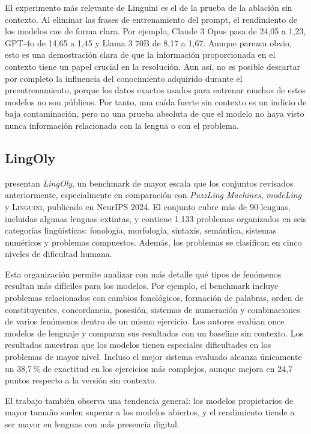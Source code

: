 El experimento más relevante de Linguini es el de la prueba de la ablación sin contexto. Al eliminar las frases de entrenamiento del prompt, el rendimiento de los modelos cae de forma clara. Por ejemplo, Claude 3 Opus pasa de 24,05 a 1,23, GPT-4o de 14,65 a 1,45 y Llama 3 70B de 8,17 a 1,67. Aunque parezca obvio, esto es una demostración clara de que la información proporcionada en el contexto tiene un papel crucial en la resolución. Aun así, no es posible descartar por completo la influencia del conocimiento adquirido durante el preentrenamiento, porque los datos exactos usados para entrenar muchos de estos modelos no son públicos. Por tanto, una caída fuerte sin contexto es un indicio de baja contaminación, pero no una prueba absoluta de que el modelo no haya visto nunca información relacionada con la lengua o con el problema.

\subsection{LingOly}

\citet{bean2024lingoly} presentan \textit{LingOly}, un benchmark de mayor escala que los conjuntos revisados anteriormente, especialmente en comparación con \textit{PuzzLing Machines}, \textit{modeLing} y \textsc{Linguini}, publicado en NeurIPS 2024. El conjunto cubre más de 90 lenguas, incluidas algunas lenguas extintas, y contiene 1.133 problemas organizados en seis categorías lingüísticas: fonología, morfología, sintaxis, semántica, sistemas numéricos y problemas compuestos. Además, los problemas se clasifican en cinco niveles de dificultad humana.

Esta organización permite analizar con más detalle qué tipos de fenómenos resultan más difíciles para los modelos. Por ejemplo, el benchmark incluye problemas relacionados con cambios fonológicos, formación de palabras, orden de constituyentes, concordancia, posesión, sistemas de numeración y combinaciones de varios fenómenos dentro de un mismo ejercicio. Los autores evalúan once modelos de lenguaje y comparan sus resultados con un baseline sin contexto. Los resultados muestran que los modelos tienen especiales dificultades en los problemas de mayor nivel. Incluso el mejor sistema evaluado alcanza únicamente un 38,7\,\% de exactitud en los ejercicios más complejos, aunque mejora en 24,7 puntos respecto a la versión sin contexto.

El trabajo también observa una tendencia general: los modelos propietarios de mayor tamaño suelen superar a los modelos abiertos, y el rendimiento tiende a ser mayor en lenguas con más presencia digital.

